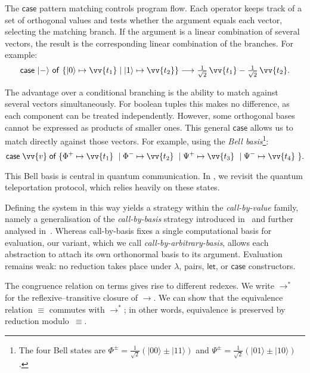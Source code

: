 \documentclass[runningheads,orivec,envcountsame,envcountsect]{llncs}
\newcommand\ket[1]{\ensuremath{|#1\rangle}}
\newcommand\lra{\longrightarrow}
\def\case#1#2#3#4#5{\ensuremath{\mathsf{case}~#1~\mathsf{of}~\{#2\mapsto #4 \mid #3\mapsto #5\}}}
\def\eval{\lra^*}
\def\sqrthalf{{\textstyle\frac{1}{\sqrt{2}}}}
\begin{document}
The $\mathsf{case}$ pattern matching controls program flow.  
Each operator keeps track of a set of orthogonal values and tests whether the
argument equals each vector, selecting the matching branch.  
If the argument is a linear combination of several vectors, the result is the
corresponding linear combination of the branches.  For example:
\[
  \case{\ket{-}}{\ket{0}}{\ket{1}}{\vv{t_1}}{\vv{t_2}} \lra
  \tfrac{1}{\sqrt{2}}\,\vv{t_1} - \tfrac{1}{\sqrt{2}}\,\vv{t_2}.
\]

The advantage over a conditional branching is the ability to match against
several vectors simultaneously.  For boolean tuples this makes no difference,
as each component can be treated independently.  However, some orthogonal bases
cannot be expressed as products of smaller ones.  This general
$\mathsf{case}$ allows us to match directly against those vectors.  For
example, using the \emph{Bell basis}\footnote{ The four Bell states are
$\Phi^{\pm}=\sqrthalf(\ket{00}\pm\ket{11})$ and
$\Psi^{\pm}=\sqrthalf(\ket{01}\pm\ket{10})$.
}:
\[
  \mathsf{case}\;\vv{v}\;\mathsf{of}\;\{
  \Phi^+ \mapsto \vv{t_1}\ \mid
  \Phi^- \mapsto \vv{t_2}\ \mid
  \Psi^+ \mapsto \vv{t_3}\ \mid
  \Psi^- \mapsto \vv{t_4}\ \}.
\]

This Bell basis is central in quantum communication. In
, we revisit the quantum teleportation protocol,
which relies heavily on these states.

Defining the system in this way yields a strategy within the
\emph{call-by-value} family, namely a generalisation of the
\emph{call-by-basis} strategy introduced in~\cite{ArrighiDowekLMCS17} and
further analysed in~\cite{AssafDiazcaroPerdrixTassonValironLMCS14}. Whereas
call-by-basis fixes a single computational basis for evaluation, our variant,
which we call \emph{call-by-arbitrary-basis}, allows each abstraction to attach
its own orthonormal basis to its argument. Evaluation remains weak: no
reduction takes place under $\lambda$, pairs, $\mathsf{let}$, or
$\mathsf{case}$ constructors.

The congruence relation on terms gives rise to different redexes. We write
$\eval$ for the reflexive–transitive closure of $\lra$. We can show that the
equivalence relation $\equiv$ commutes with $\eval$; in other words,
equivalence is preserved by reduction modulo~$\equiv$.
\end{document}
